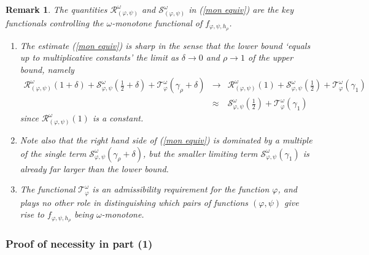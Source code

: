 \documentclass{amsart}
\theoremstyle{plain}
\newtheorem{remark}[theorem]{Remark}
\numberwithin{equation}{section}
\begin{document}
\begin{remark}
The quantities $\mathcal{R}_{\left( \varphi ,\psi \right) }^{\omega }$ and $%
\mathcal{S}_{\left( \varphi ,\psi \right) }^{\omega }$ in (\ref{mon equiv}) are the key functionals controlling the $%
\omega $-monotone functional of $f_{\varphi ,\psi ,h_{\rho }}$.

\begin{enumerate}
\item The estimate (\ref{mon equiv}) is sharp in the sense that the lower
bound `equals up to multiplicative constants' the limit as $\delta
\rightarrow 0$ and $\rho \rightarrow 1$ of the upper bound, namely 
\begin{eqnarray*}
\mathcal{R}_{\left( \varphi ,\psi \right) }^{\omega }\left( 1+\delta \right)
+\mathcal{S}_{\varphi ,\psi }^{\omega }\left( \frac{1}{2}+\delta \right) +%
\mathcal{T}_{\varphi }^{\omega }\left( \gamma _{\rho }+\delta \right)
&\longrightarrow &\mathcal{R}_{\left( \varphi ,\psi \right) }^{\omega
}\left( 1\right) +\mathcal{S}_{\varphi ,\psi }^{\omega }\left( \frac{1}{2}%
\right) +\mathcal{T}_{\varphi }^{\omega }\left( \gamma _{1}\right) \\
&\approx &\mathcal{S}_{\varphi ,\psi }^{\omega }\left( \frac{1}{2}\right) +%
\mathcal{T}_{\varphi }^{\omega }\left( \gamma _{1}\right)
\end{eqnarray*}%
since $\mathcal{R}_{\left( \varphi ,\psi \right) }^{\omega }\left( 1\right) $
is a constant.

\item Note also that the right hand side of (\ref{mon equiv}) is dominated
by a multiple of the single term $\mathcal{S}_{\varphi ,\psi }^{\omega
}\left( \gamma _{\rho }+\delta \right) $, but the smaller limiting term $%
\mathcal{S}_{\varphi ,\psi }^{\omega }\left( \gamma _{1}\right) $ is already
far larger than the lower bound.

\item The functional $\mathcal{T}_{\varphi }^{\omega }$ is an admissibility
requirement for the function $\varphi $, and plays no other role in
distinguishing which pairs of functions $\left( \varphi ,\psi \right) $ give
rise to $f_{\varphi ,\psi ,h_{\rho }}$ being $\omega $-monotone.
\end{enumerate}
\end{remark}

\subsubsection{Proof of necessity in part (1)}
\end{document}
